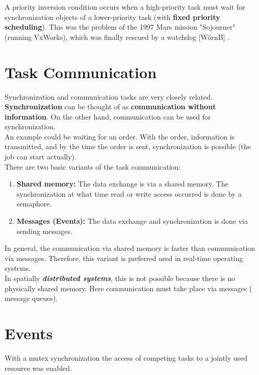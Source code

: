 A priority inversion condition occurs when a high-priority task must wait for synchronization objects of a lower-priority task (with \textbf{fixed priority scheduling}). This was the problem of the 1997 Mars mission "Sojourner" (running VxWorks), which was finally rescued by a watchdog [W\"{o}rnB] .


\section{Task Communication}

Synchronization and communication tasks are very closely related. \textbf{Synchronization} can be thought of as\textbf{ communication without information}. On the other hand, communication can be used for synchronization.\\

An example could be waiting for an order. With the order, information is transmitted, and by the time the order is sent, synchronization is possible (the job can start actually).\\

There are two basic variants of the task communication:

\begin{enumerate}
	\item  \textbf{Shared memory: } The data exchange is via a shared memory. The synchronization at what time read or write access occurred is done by a semaphore.
	\item  \textbf{Messages (Events): }The data exchange and synchronization is done via sending messages.
\end{enumerate}

In general, the communication via shared memory is faster than communication via messages. Therefore, this variant is preferred used in real-time operating systems. \\

In spatially \textbf{\textit{distributed systems}}, this is not possible because there is no physically shared memory. Here communication must take place via messages ( message queues).

\section{Events}

With a mutex synchronization the access of competing tasks to a jointly used resource was enabled. \\

